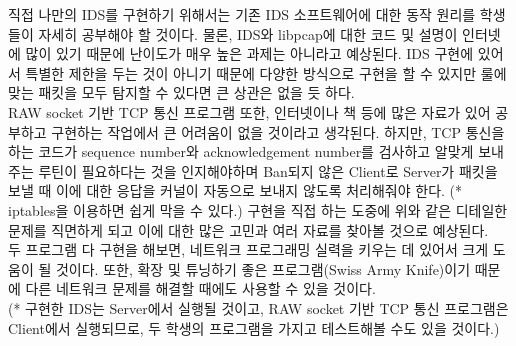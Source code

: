 \documentclass[a4paper, 11pt]{article}
\theoremstyle{definition}
\begin{document}
직접 나만의 IDS를 구현하기 위해서는 기존 IDS 소프트웨어에 대한 동작 원리를 학생들이 자세히 공부해야 할 것이다. 물론, IDS와 libpcap에 대한 코드 및 설명이 인터넷에 많이 있기 때문에 난이도가 매우 높은 과제는 아니라고 예상된다. IDS 구현에 있어서 특별한 제한을 두는 것이 아니기 때문에 다양한 방식으로 구현을 할 수 있지만 룰에 맞는 패킷을 모두 탐지할 수 있다면 큰 상관은 없을 듯 하다.
\\RAW socket 기반 TCP 통신 프로그램 또한, 인터넷이나 책 등에 많은 자료가 있어 공부하고 구현하는 작업에서 큰 어려움이 없을 것이라고 생각된다. 하지만, TCP 통신을 하는 코드가 sequence number와 acknowledgement number를 검사하고 알맞게 보내주는 루틴이 필요하다는 것을 인지해야하며 Ban되지 않은 Client로 Server가 패킷을 보낼 때 이에 대한 응답을 커널이 자동으로 보내지 않도록 처리해줘야 한다. (* iptables을 이용하면 쉽게 막을 수 있다.) 구현을 직접 하는 도중에 위와 같은 디테일한 문제를 직면하게 되고 이에 대한 많은 고민과 여러 자료를 찾아볼 것으로 예상된다.
\\두 프로그램 다 구현을 해보면, 네트워크 프로그래밍 실력을 키우는 데 있어서 크게 도움이 될 것이다. 또한, 확장 및 튜닝하기 좋은 프로그램(Swiss Army Knife)이기 때문에 다른 네트워크 문제를 해결할 때에도 사용할 수 있을 것이다.
\\(* 구현한 IDS는 Server에서 실행될 것이고, RAW socket 기반 TCP 통신 프로그램은 Client에서 실행되므로, 두 학생의 프로그램을 가지고 테스트해볼 수도 있을 것이다.)



\end{document}
